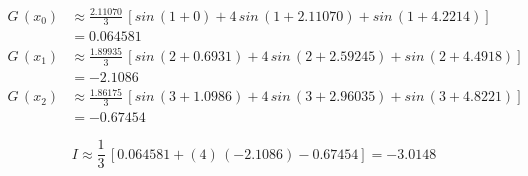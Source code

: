 \begin{example}
\[
 \begin{array}{ll}
  G\,(x_0) & \approx \displaystyle \frac{2.11070}{3} \, \left[ sin\,(1+0) + 4\,sin\,(1+2.11070) + sin\,(1+4.2214) \right] \\
           & = 0.064581 \\
  G\,(x_1) & \approx \displaystyle \frac{1.89935}{3} \, \left[ sin\,(2+0.6931) + 4\,sin\,(2+2.59245) + sin\,(2+4.4918) \right] \\
           & = -2.1086 \\
  G\,(x_2) & \approx \displaystyle \frac{1.86175}{3} \, \left[ sin\,(3+1.0986) + 4\,sin\,(3+2.96035) + sin\,(3+4.8221) \right] \\
           & = -0.67454
 \end{array}
\]

\[
 I \approx \frac{1}{3} \, \left[ 0.064581 + (4)\,(-2.1086) - 0.67454 \right] = -3.0148
\]

\end{example}
